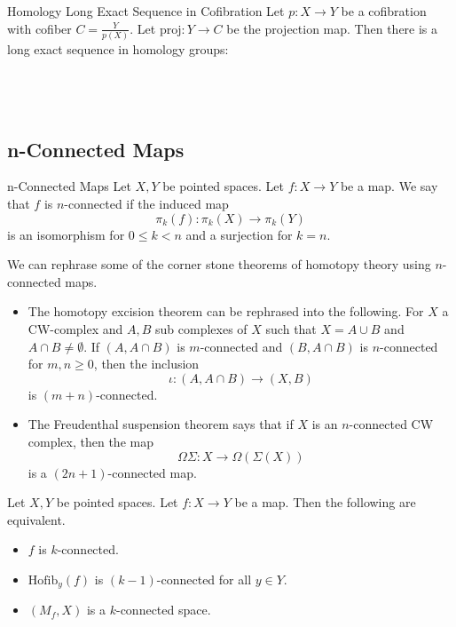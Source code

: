 \documentclass[a4paper]{article}
\begin{document}
\begin{thm}{Homology Long Exact Sequence in Cofibration}{} Let $p:X\to Y$ be a cofibration with cofiber $C=\frac{Y}{p(X)}$. Let $\text{proj}:Y\to C$ be the projection map. Then there is a long exact sequence in homology groups: \\~\\
\\~\\
\end{thm}

\subsection{n-Connected Maps}
\begin{defn}{n-Connected Maps}{} Let $X,Y$ be pointed spaces. Let $f:X\to Y$ be a map. We say that $f$ is $n$-connected if the induced map $$\pi_k(f):\pi_k(X)\to\pi_k(Y)$$ is an isomorphism for $0\leq k<n$ and a surjection for $k=n$. 
\end{defn}

We can rephrase some of the corner stone theorems of homotopy theory using $n$-connected maps. 
\begin{itemize}
\item The homotopy excision theorem can be rephrased into the following. For $X$ a CW-complex and $A,B$ sub complexes of $X$ such that $X=A\cup B$ and $A\cap B\neq\emptyset$. If $(A,A\cap B)$ is $m$-connected and $(B,A\cap B)$ is $n$-connected for $m,n\geq 0$, then the inclusion $$\iota:(A,A\cap B)\to(X,B)$$ is $(m+n)$-connected. 
\item The Freudenthal suspension theorem says that if $X$ is an $n$-connected CW complex, then the map $$\Omega\Sigma:X\to\Omega(\Sigma(X))$$ is a $(2n+1)$-connected map. 
\end{itemize}

\begin{prp}{}{} Let $X,Y$ be pointed spaces. Let $f:X\to Y$ be a map. Then the following are equivalent. 
\begin{itemize}
\item $f$ is $k$-connected. 
\item $\text{Hofib}_y(f)$ is $(k-1)$-connected for all $y\in Y$. 
\item $(M_f,X)$ is a $k$-connected space. 
\end{itemize}
\end{prp}
\end{document}
